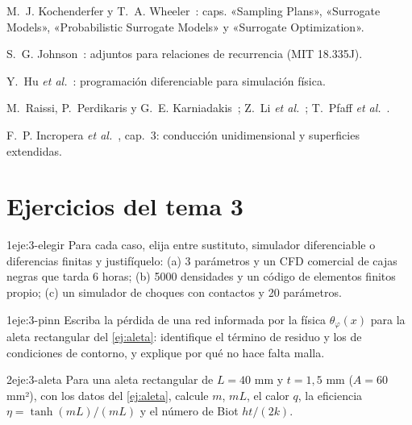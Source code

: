 \begin{lecturas}
\item M.~J. Kochenderfer y T.~A. Wheeler~\cite{kw}: caps. «Sampling Plans», «Surrogate Models», «Probabilistic Surrogate Models» y «Surrogate Optimization».
\item S.~G. Johnson~\cite{johnson}: adjuntos para relaciones de recurrencia (MIT 18.335J).
\item Y.~Hu \emph{et al.}~\cite{difftaichi}: programación diferenciable para simulación física.
\item M.~Raissi, P.~Perdikaris y G.~E. Karniadakis~\cite{pinn}; Z.~Li \emph{et al.}~\cite{fno}; T.~Pfaff \emph{et al.}~\cite{mgn}.
\item F.~P. Incropera \emph{et al.}~\cite{incropera}, cap.~3: conducción unidimensional y superficies extendidas.
\end{lecturas}

\section*{Ejercicios del tema 3}

\begin{ejercicio}{1}{eje:3-elegir}
Para cada caso, elija entre sustituto, simulador diferenciable o diferencias finitas y justifíquelo: (a) 3 parámetros y un CFD comercial de cajas negras que tarda 6 horas; (b) 5000 densidades y un código de elementos finitos propio; (c) un simulador de choques con contactos y 20 parámetros.
\end{ejercicio}

\begin{ejercicio}{1}{eje:3-pinn}
Escriba la pérdida de una red informada por la física $\theta_\varphi(x)$ para la aleta rectangular del \cref{ej:aleta}: identifique el término de residuo y los de condiciones de contorno, y explique por qué no hace falta malla.
\end{ejercicio}

\begin{ejercicio}{2}{eje:3-aleta}
Para una aleta rectangular de $L=40$ mm y $t=1{,}5$ mm ($A=60$ mm²), con los datos del \cref{ej:aleta}, calcule $m$, $mL$, el calor $q$, la eficiencia $\eta=\tanh(mL)/(mL)$ y el número de Biot $ht/(2k)$.
\end{ejercicio}

